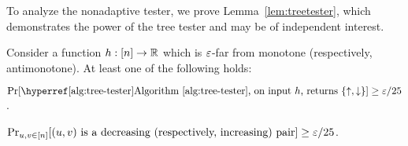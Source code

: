 To analyze the nonadaptive tester,
we prove Lemma~\ref{lem:treetester}, which demonstrates the power of the tree tester and  may be of independent interest.

\begin{lemma}\label{lem:treetester}
	Consider a function $h:[n]\to {\mathbb R}$ which is $\varepsilon$-far from monotone (respectively, antimonotone). At least one of the following holds:
	\begin{compactenum}
		\item $\Pr[\text{\Alg{tree-tester}, on input $h$, returns }\{\uparrow,\downarrow\}] \geq \eps/25$.%
		\item $\Pr_{u,v \in [n]}[(u,v) \textrm{ is a decreasing (respectively, increasing)  pair}] \geq \varepsilon/25$.
	\end{compactenum}
\end{lemma}


